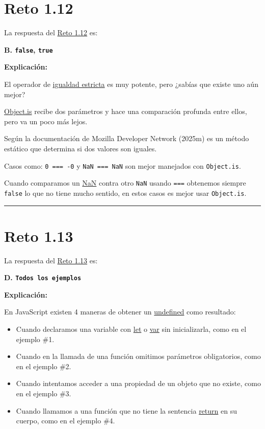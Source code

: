\documentclass[
  letterpaper,
  DIV=11,
  numbers=noendperiod]{scrreprt}
\begin{document}
\section{Reto 1.12}\label{sec-sol-cap1-reto12}

La respuesta del \hyperref[sec-cap1-reto12]{Reto 1.12} es:

\textbf{B. \texttt{false}, \texttt{true}}

\textbf{Explicación:}

El operador de \hyperref[glos-igualdad_estricta]{igualdad estricta} es
muy potente, pero ¿sabías que existe uno aún mejor?

\hyperref[glos-object_is]{Object.is} recibe dos parámetros y hace una
comparación profunda entre ellos, pero va un poco más lejos.

Según la documentación de Mozilla Developer Network (2025m) es un método
estático que determina si dos valores son iguales.

Casos como: \texttt{0\ ===\ -0} y \texttt{NaN\ ===\ NaN} son mejor
manejados con \texttt{Object.is}.

Cuando comparamos un \hyperref[glos-nan]{NaN} contra otro \texttt{NaN}
usando \texttt{===} obtenemos siempre \texttt{false} lo que no tiene
mucho sentido, en estos casos es mejor usar \texttt{Object.is}.

\begin{center}\rule{0.5\linewidth}{0.5pt}\end{center}

\section{Reto 1.13}\label{sec-sol-cap1-reto13}

La respuesta del \hyperref[sec-cap1-reto13]{Reto 1.13} es:

\textbf{D. \texttt{Todos\ los\ ejemplos}}

\textbf{Explicación:}

En JavaScript existen 4 maneras de obtener un
\hyperref[glos-undefined]{undefined} como resultado:

\begin{itemize}
\item
  Cuando declaramos una variable con \hyperref[glos-let]{let} o
  \hyperref[glos-var]{var} sin inicializarla, como en el ejemplo \#1.
\item
  Cuando en la llamada de una función omitimos parámetros obligatorios,
  como en el ejemplo \#2.
\item
  Cuando intentamos acceder a una propiedad de un objeto que no existe,
  como en el ejemplo \#3.
\item
  Cuando llamamos a una función que no tiene la sentencia
  \hyperref[glos-return]{return} en su cuerpo, como en el ejemplo \#4.
\end{itemize}
\end{document}
